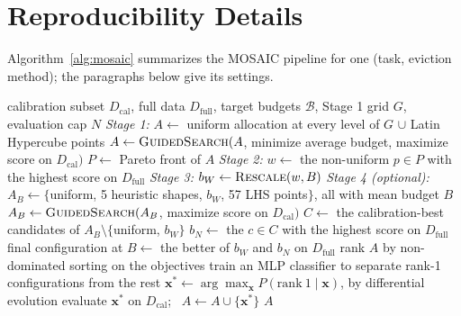 \section{Reproducibility Details}
\label{app:repro}

Algorithm~\ref{alg:mosaic} summarizes the MOSAIC pipeline for one (task, eviction method); the paragraphs below give its settings.

\begin{algorithm}[t]
\caption{MOSAIC for one (task, eviction method).}
\label{alg:mosaic}
\footnotesize
\begin{algorithmic}[1]
\Require calibration subset $D_{\mathrm{cal}}$, full data $D_{\mathrm{full}}$, target budgets $\mathcal{B}$, Stage 1 grid $G$, evaluation cap $N$
\State \textit{Stage 1:} $A \gets$ uniform allocation at every level of $G$ $\cup$ Latin Hypercube points 
\State $A \gets \textsc{GuidedSearch}(A$, minimize average budget, maximize score on $D_{\mathrm{cal}})$
\State $P \gets$ Pareto front of $A$
\State \textit{Stage 2:} $w \gets$ the non-uniform $p \in P$ with the highest score on $D_{\mathrm{full}}$
  \State \textit{Stage 3:} $b_W \gets \textsc{Rescale}(w, B)$ 
  \State \textit{Stage 4 (optional):} $A_B \gets \{$uniform, 5 heuristic shapes, $b_W$, 57 LHS points$\}$, all with mean budget $B$
  \State $A_B \gets \textsc{GuidedSearch}(A_B$, maximize score on $D_{\mathrm{cal}})$
  \State $C \gets$ the calibration-best candidates of $A_B \setminus \{$uniform, $b_W\}$
  \State $b_N \gets$ the $c \in C$ with the highest score on $D_{\mathrm{full}}$ 
  \State final configuration at $B \gets$ the better of $b_W$ and $b_N$ on $D_{\mathrm{full}}$
\EndFor
\Statex
{}
  \Repeat
    \State rank $A$ by non-dominated sorting on the objectives
    \State train an MLP classifier to separate rank-1 configurations from the rest
    \State $\mathbf{x}^* \gets \arg\max_{\mathbf{x}} P(\mathrm{rank}\ 1 \mid \mathbf{x})$, by differential evolution
    \State evaluate $\mathbf{x}^*$ on $D_{\mathrm{cal}}$; \ $A \gets A \cup \{\mathbf{x}^*\}$
  \State \Return $A$
\EndProcedure
\end{algorithmic}
\end{algorithm}

